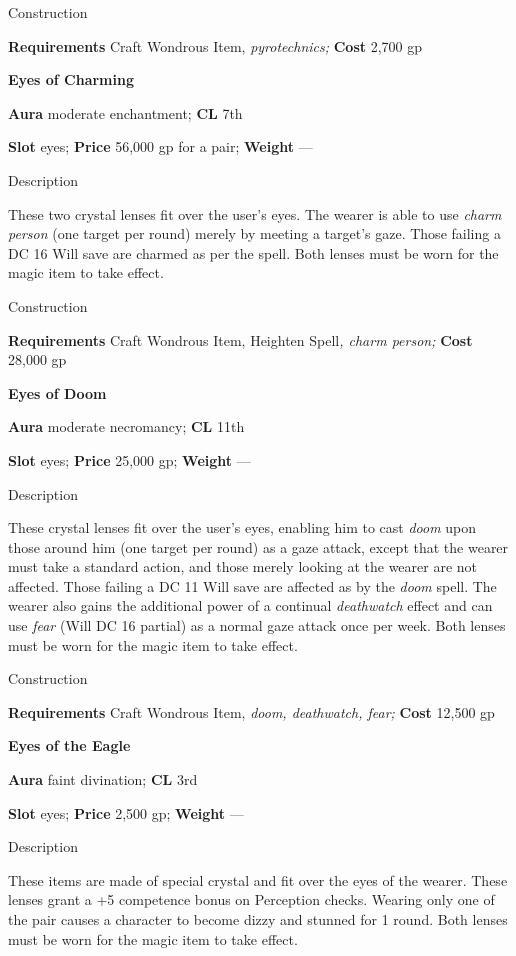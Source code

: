 Construction
				
\textbf{Requirements} Craft Wondrous Item,\textit{ pyrotechnics;}\textbf{ Cost }2,700 gp
				
\textbf{Eyes of Charming}
				
\textbf{Aura} moderate enchantment;\textbf{ CL }7th
				
\textbf{Slot} eyes; \textbf{Price} 56,000 gp for a pair; \textbf{Weight }---
				
Description
				
These two crystal lenses fit over the user's eyes. The wearer is able to use \textit{charm person} (one target per round) merely by meeting a target's gaze. Those failing a DC 16 Will save are charmed as per the spell. Both lenses must be worn for the magic item to take effect. 
				
Construction
				
\textbf{Requirements} Craft Wondrous Item, Heighten Spell\textit{, charm person;}\textbf{ Cost }28,000 gp
				
\textbf{Eyes of Doom}
				
\textbf{Aura} moderate necromancy;\textbf{ CL }11th
				
\textbf{Slot} eyes; \textbf{Price} 25,000 gp; \textbf{Weight }---
				
Description
				
These crystal lenses fit over the user's eyes, enabling him to cast \textit{doom} upon those around him (one target per round) as a gaze attack, except that the wearer must take a standard action, and those merely looking at the wearer are not affected. Those failing a DC 11 Will save are affected as by the \textit{doom} spell. The wearer also gains the additional power of a continual \textit{deathwatch} effect and can use \textit{fear }(Will DC 16 partial) as a normal gaze attack once per week. Both lenses must be worn for the magic item to take effect. 
				
Construction
				
\textbf{Requirements} Craft Wondrous Item,\textit{ doom, deathwatch, fear;}\textbf{ Cost }12,500 gp
				
\textbf{Eyes of the Eagle}
				
\textbf{Aura} faint divination;\textbf{ CL }3rd
				
\textbf{Slot} eyes; \textbf{Price} 2,500 gp; \textbf{Weight }---
				
Description
				
These items are made of special crystal and fit over the eyes of the wearer. These lenses grant a +5 competence bonus on Perception checks. Wearing only one of the pair causes a character to become dizzy and stunned for 1 round. Both lenses must be worn for the magic item to take effect. 
				
